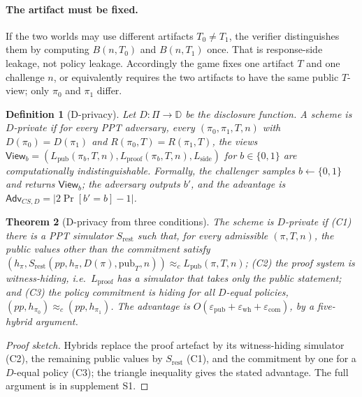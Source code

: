 \documentclass[10pt,journal,compsoc]{IEEEtran}
\newtheorem{theorem}{Theorem}
\newtheorem{definition}[theorem]{Definition}
\begin{document}
\paragraph{The artifact must be fixed.} If the two worlds may use different
artifacts $T_0\neq T_1$, the verifier distinguishes them by computing $B(n,T_0)$
and $B(n,T_1)$ once. That is response-side leakage, not policy leakage.
Accordingly the game fixes one artifact $T$ and one challenge $n$, or
equivalently requires the two artifacts to have the same public $T$-view; only
$\pi_0$ and $\pi_1$ differ.

\begin{definition}[D-privacy]
\label{def:dpriv}
Let $D:\Pi\to\mathbb{D}$ be the disclosure function. A scheme is
$D$-private if for every PPT adversary, every $(\pi_0,\pi_1,T,n)$ with
$D(\pi_0)=D(\pi_1)$ and $R(\pi_0,T)=R(\pi_1,T)$, the views
$\mathsf{View}_b=(L_{\mathrm{pub}}(\pi_b,T,n),L_{\mathrm{proof}}(\pi_b,T,n),
L_{\mathrm{side}})$ for $b\in\{0,1\}$ are computationally indistinguishable.
Formally, the challenger samples $b\leftarrow\{0,1\}$ and returns
$\mathsf{View}_b$; the adversary outputs $b'$, and the advantage is
$\mathsf{Adv}_{CS,D}=|2\Pr[b'=b]-1|$.
\end{definition}

\begin{theorem}[D-privacy from three conditions]
\label{thm:dpriv}
The scheme is $D$-private if (C1) there is a PPT simulator $S_{\mathrm{rest}}$
such that, for every admissible $(\pi,T,n)$, the public values other than the
commitment satisfy
$(h_\pi,S_{\mathrm{rest}}(pp,h_\pi,D(\pi),\mathrm{pub}_T,n))\approx_c
L_{\mathrm{pub}}(\pi,T,n)$; (C2) the proof system is witness-hiding, i.e.\
$L_{\mathrm{proof}}$ has a simulator that takes only the public statement;
and (C3) the policy commitment is hiding for all $D$-equal policies,
$(pp,h_{\pi_0})\approx_c(pp,h_{\pi_1})$. The advantage is
$O(\varepsilon_{\mathrm{pub}}+\varepsilon_{\mathrm{wh}}+\varepsilon_{\mathrm{com}})$,
by a five-hybrid argument.
\end{theorem}

\begin{proof}[Proof sketch]
Hybrids replace the proof artefact by its witness-hiding simulator (C2), the
remaining public values by $S_{\mathrm{rest}}$ (C1), and the commitment by one
for a $D$-equal policy (C3); the triangle inequality gives the stated
advantage. The full argument is in supplement S1.
\end{proof}
\end{document}
